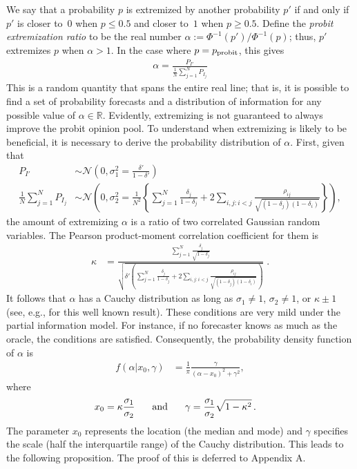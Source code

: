 \documentclass[11pt]{article}
\theoremstyle{definition}
\theoremstyle{definition}
\def\probit{p_{\rm probit}}
\begin{document}
We say that a probability $p$ is extremized by another probability $p'$ 
if and only if $p'$ is closer to~$0$ when $p \leq 0.5$ and closer 
to~$1$ when $p \geq 0.5$.  Define the {\em probit extremization ratio}
to be the real number $\alpha := \Phi^{-1}(p') / \Phi^{-1} (p)$; thus,
$p'$ extremizes $p$ when $\alpha > 1$.  In the case where $p = \probit$,
this gives
\begin{align}
\alpha  = \frac{P_{I'}}{\frac{1}{N}\sum_{j=1}^N P_{I_j}}\label{alpha}
\end{align}
%
This is a random quantity that spans the entire real line; that is, 
it is possible to find a set of probability forecasts and a distribution 
of information for any possible value of $\alpha \in \mathbb{R}$. 
Evidently, extremizing is not guaranteed to always improve the 
probit opinion pool.  
To understand when extremizing is likely to be beneficial, 
it is necessary to derive the probability distribution of $\alpha$. 
First, given that 
\begin{align*}
P_{I'} &\sim \mathcal{N}\left(0, \sigma^2_{1} = 
  \frac{\delta'}{1-\delta'} \right)\\ \frac{1}{N}\sum_{j=1}^N P_{I_j} 
&\sim \mathcal{N}\left(0, \sigma^2_{2} =\frac{1}{N^2} 
  \left\{ \sum_{j=1}^N \frac{\delta_j}{1-\delta_j} 
  + 2 \sum_{i,j: i<j} \frac{\rho_{ij}}{\sqrt{(1-\delta_j)(1-\delta_i)}}
  \right\} \right),
\end{align*}
the amount of extremizing $\alpha$ is a ratio of two correlated 
Gaussian random variables.  The Pearson product-moment correlation 
coefficient for them is
\begin{align*}
\kappa  &= 
  \frac{ \sum_{j=1}^N \frac{\delta_j}{\sqrt{1-\delta_j}}}
  {\sqrt{\delta'  \left( \sum_{j=1}^N \frac{\delta_j}{1-\delta_j} + 2 
  \sum_{i,j: i<j} \frac{\rho_{ij}}{\sqrt{(1-\delta_j)(1-\delta_i)}}\right)}}
  \; .
\end{align*}
It follows that $\alpha$ has a Cauchy distribution as long as 
$\sigma_1 \neq 1$, $\sigma_2 \neq 1$, or $\kappa \pm 1$ 
(see, e.g., \citealt{cedilnik2004distribution} for this 
well known result).  These conditions are very mild under 
the partial information model.  For instance, if no forecaster 
knows as much as the oracle, the conditions are satisfied. 
Consequently, the probability density function of $\alpha$ is
\begin{align*}
f(\alpha | x_0, \gamma) &= \frac{1}{\pi} 
  \frac{\gamma}{(\alpha-x_0)^2+\gamma^2}, 
\end{align*}
where 
\begin{align*}
x_0 = \kappa \frac{\sigma_1}{\sigma_2} \hspace{0.2in} \mbox{ and } 
  \hspace{0.2in} \gamma &= \frac{\sigma_1}{\sigma_2} \sqrt{1-\kappa^2} \, .
\end{align*}
The parameter $x_0$ represents the location (the median and mode) and 
$\gamma$ specifies the scale (half the interquartile range) of the 
Cauchy distribution. This leads to the following proposition. 
The proof of this is deferred to Appendix A.
\end{document}
